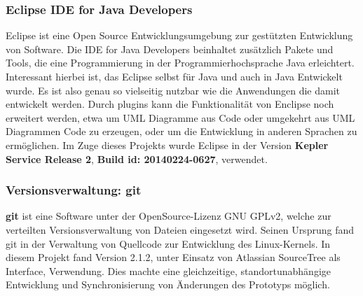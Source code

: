 \documentclass[12pt,a4paper,bibliography=totocnumbered,listof=totocnumbered]{scrartcl}
\begin{document}
\subsubsection{Eclipse IDE for Java Developers}
Eclipse ist eine Open Source Entwicklungsumgebung zur gestützten Entwicklung von Software. Die IDE for Java Developers beinhaltet zusätzlich Pakete und Tools, die eine Programmierung in der Programmierhochsprache Java erleichtert. Interessant hierbei ist, das Eclipse selbst für Java und auch in Java Entwickelt wurde. Es ist also genau so vielseitig nutzbar wie die Anwendungen die damit entwickelt werden. Durch plugins kann die Funktionalität von Enclipse noch erweitert werden, etwa um UML Diagramme aus Code oder umgekehrt aus UML Diagrammen Code zu erzeugen, oder um die Entwicklung in anderen Sprachen zu ermöglichen. Im Zuge dieses Projekts wurde Eclipse in der Version \textbf{Kepler Service Release 2}, \textbf{Build id: 20140224-0627}, verwendet.

\subsubsection{Versionsverwaltung: git}
\textbf{git} ist eine Software unter der OpenSource-Lizenz GNU GPLv2, welche zur verteilten Versionsverwaltung von Dateien eingesetzt wird. Seinen Ursprung fand git in der Verwaltung von Quellcode zur Entwicklung des Linux-Kernels. In diesem Projekt fand Version 2.1.2, unter Einsatz von Atlassian SourceTree als Interface, Verwendung. Dies machte eine gleichzeitige, standortunabhängige Entwicklung und Synchronisierung von Änderungen des Prototyps möglich. \cite{31}
\end{document}
